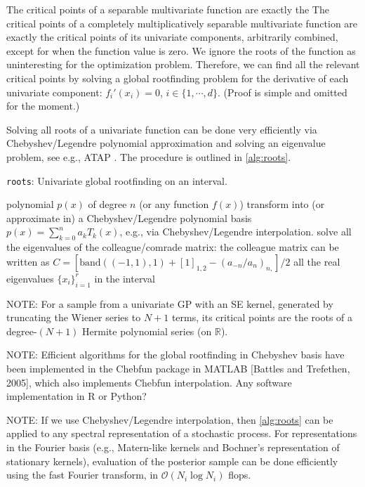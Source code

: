 \documentclass{article}
\newcommand{\edit}[1]{\textcolor{blue!80!black}{#1}} %
\begin{document}
The critical points of a separable multivariate function are exactly the
The critical points of a \edit{completely multiplicatively} separable multivariate function are exactly the
critical points of its univariate components, arbitrarily combined,
except for when the function value is zero. We ignore the roots of the
function as uninteresting for the optimization problem. Therefore, we
can find all the relevant critical points by solving a global
rootfinding problem for the derivative of each univariate component:
$f_i'(x_i) = 0$, $i \in \{1, \cdots, d\}$. (Proof is simple and
omitted for the moment.)

Solving all roots of a univariate function can be done very efficiently
via Chebyshev/Legendre polynomial approximation and solving an
eigenvalue problem, see e.g., ATAP \cite{Trefethen2019}. The procedure
is outlined in \cref{alg:roots}.

\begin{algorithm}[h]
  \caption{\texttt{roots}: Univariate global rootfinding on an interval.}
  \label{alg:roots}
  \begin{algorithmic}[1] %
    \Input polynomial $p(x)$ of degree $n$ (or any function $f(x)$)
    \State transform into (or approximate in) a Chebyshev/Legendre polynomial basis\newline
    $p(x) = \sum_{k=0}^n a_k T_k(x)$, e.g., via Chebyshev/Legendre interpolation.
    \State solve all the eigenvalues of the colleague/comrade matrix:\newline
    the colleague matrix can be written as
    $C = [\mathrm{band}((-1, 1), 1) + [1]_{1,2} - (a_{-n} / a_n)_{n,}] / 2$
    \Output all the real eigenvalues $\{x_i\}_{i=1}^r$ in the interval
  \end{algorithmic}
\end{algorithm}

NOTE: For a sample from a univariate GP with an SE kernel, generated by
truncating the Wiener series to $N+1$ terms, its critical points are
the roots of a degree-$(N+1)$ Hermite polynomial series (on
$\mathbb{R}$).

NOTE: Efficient algorithms for the global rootfinding in Chebyshev basis
have been implemented in the Chebfun package in MATLAB [Battles and
Trefethen, 2005], which also implements Chebfun
interpolation. Any software implementation in R or Python?

NOTE: If we use Chebyshev/Legendre interpolation,
then \cref{alg:roots} can be applied to any spectral representation of a stochastic process.
For representations in the Fourier basis
(e.g., Matern-like kernels and Bochner's representation of stationary kernels),
evaluation of the posterior sample can be done efficiently using the fast Fourier transform,
in $\mathcal{O}(N_i \log N_i)$ flops.
\end{document}
